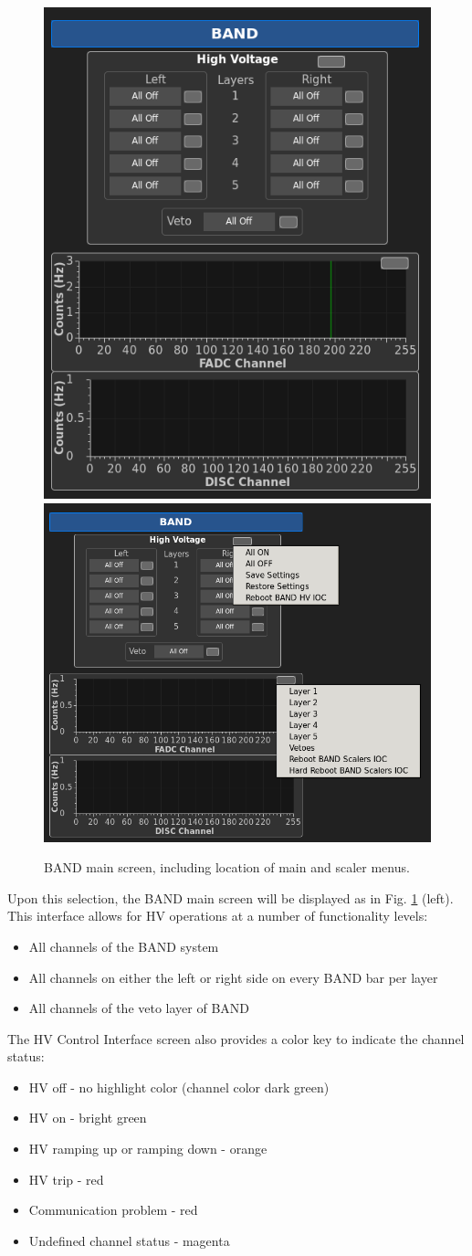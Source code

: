 \documentclass[12pt,letterpaper]{article}
\begin{document}
\begin{figure}
\centering
{\includegraphics[width=.367\textwidth]{MainScreenshot.png}}
{\includegraphics[width=.533\textwidth]{MainScreenshotTwoMenus.png}}

\caption{BAND main screen, including location of main and scaler menus.}
\label{fig:BANDMenu}
\end{figure}
Upon this selection, the BAND main screen will be displayed as in Fig. \ref{fig:BANDMenu} (left).
This interface allows for HV operations at a number of functionality levels:
\begin{itemize}
\item All channels of the BAND system
\item All channels on either the left or right side on every BAND bar per layer
\item All channels of the veto layer of BAND
\end{itemize}
The HV Control Interface screen also provides a color key to indicate the channel status:
\begin{itemize}
\item HV off - no highlight color (channel color dark green)
\item HV on - bright green
\item HV ramping up or ramping down - orange
\item HV trip - red
\item Communication problem - red
\item Undefined channel status - magenta
\end{itemize}
\end{document}
